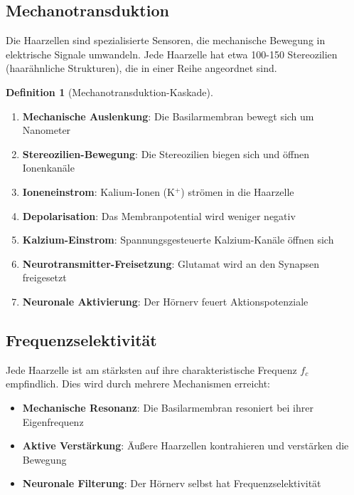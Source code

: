 ﻿\documentclass[a4paper,12pt]{report}
\theoremstyle{definition}
\newtheorem{definition}{Definition}
\begin{document}
	\subsection{Mechanotransduktion}
	
	Die Haarzellen sind spezialisierte Sensoren, die mechanische Bewegung in elektrische Signale umwandeln. Jede Haarzelle hat etwa 100-150 Stereozilien (haarähnliche Strukturen), die in einer Reihe angeordnet sind.
	
	\begin{definition}[Mechanotransduktion-Kaskade]
		\begin{enumerate}
			\item[-] \textbf{Mechanische Auslenkung}: Die Basilarmembran bewegt sich um Nanometer
			\item[-] \textbf{Stereozilien-Bewegung}: Die Stereozilien biegen sich und öffnen Ionenkanäle
			\item[-] \textbf{Ioneneinstrom}: Kalium-Ionen (K$^+$) strömen in die Haarzelle
			\item[-] \textbf{Depolarisation}: Das Membranpotential wird weniger negativ
			\item[-] \textbf{Kalzium-Einstrom}: Spannungsgesteuerte Kalzium-Kanäle öffnen sich
			\item[-] \textbf{Neurotransmitter-Freisetzung}: Glutamat wird an den Synapsen freigesetzt
			\item[-] \textbf{Neuronale Aktivierung}: Der Hörnerv feuert Aktionspotenziale
		\end{enumerate}
	\end{definition}
	
	\subsection{Frequenzselektivität}
	
	Jede Haarzelle ist am stärksten auf ihre charakteristische Frequenz $f_c$ empfindlich. Dies wird durch mehrere Mechanismen erreicht:
	
	\begin{itemize}
		\item[-] \textbf{Mechanische Resonanz}: Die Basilarmembran resoniert bei ihrer Eigenfrequenz
		\item[-] \textbf{Aktive Verstärkung}: Äußere Haarzellen kontrahieren und verstärken die Bewegung
		\item[-] \textbf{Neuronale Filterung}: Der Hörnerv selbst hat Frequenzselektivität
	\end{itemize}
	
\end{document}
